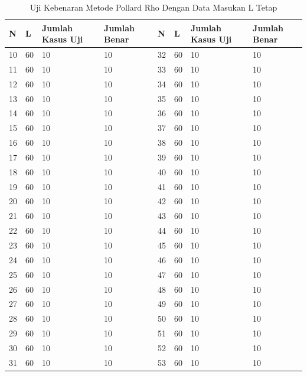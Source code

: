 \begin{table}[h!]
\caption{Uji Kebenaran Metode Pollard Rho Dengan Data Masukan L Tetap}
\label{tab:test_result_fixed_l}
\begin{tabularx} {\linewidth}{ |l l X X|l l X X| }
\hline
N	&L	&Jumlah Kasus Uji	&Jumlah Benar	&N	&L	&Jumlah Kasus Uji	&Jumlah Benar \\
\hline
10&	60&	10&					10&				32&	60&	10&	10 \\ 
11&	60&	10&					10&				33&	60&	10&	10 \\ 
12&	60&	10&					10&				34&	60&	10&	10 \\ 
13&	60&	10&					10&				35&	60&	10&	10 \\ 
14&	60&	10&					10&				36&	60&	10&	10 \\ 
15&	60&	10&					10&				37&	60&	10&	10 \\ 
16&	60&	10&					10&				38&	60&	10&	10 \\ 
17&	60&	10&					10&				39&	60&	10&	10 \\ 
18&	60&	10&					10&				40&	60&	10&	10 \\ 
19&	60&	10&					10&				41&	60&	10&	10 \\ 
20&	60&	10&					10&				42&	60&	10&	10 \\ 
21&	60&	10&					10&				43&	60&	10&	10 \\ 
22&	60&	10&					10&				44&	60&	10&	10 \\ 
23&	60&	10&					10&				45&	60&	10&	10 \\ 
24&	60&	10&					10&				46&	60&	10&	10 \\ 
25&	60&	10&					10&				47&	60&	10&	10 \\ 
26&	60&	10&					10&				48&	60&	10&	10 \\ 
27&	60&	10&					10&				49&	60&	10&	10 \\ 
28&	60&	10&					10&				50&	60&	10&	10 \\ 
29&	60&	10&					10&				51&	60&	10&	10 \\ 
30&	60&	10&					10&				52&	60&	10&	10 \\ 
31&	60&	10&					10&				53&	60&	10&	10 \\
\hline
\end{tabularx}
\end{table}
\pagebreak

